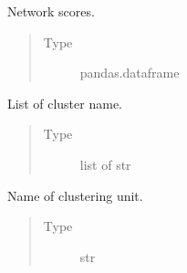 \documentclass[letterpaper,10pt,english]{sphinxmanual}
\begin{document}
\begin{fulllineitems}
\begin{fulllineitems}
\begin{quote}
\begin{description}
\end{description}\end{quote}

\end{fulllineitems}


\begin{fulllineitems}
\label{\detokenize{modules/celloracle:celloracle.Links.merged_score}}
Network scores.
\begin{quote}\begin{description}
\item[{Type}] \leavevmode
pandas.dataframe

\end{description}\end{quote}

\end{fulllineitems}


\begin{fulllineitems}
\label{\detokenize{modules/celloracle:celloracle.Links.cluster}}
List of cluster name.
\begin{quote}\begin{description}
\item[{Type}] \leavevmode
list of str

\end{description}\end{quote}

\end{fulllineitems}


\begin{fulllineitems}
\label{\detokenize{modules/celloracle:celloracle.Links.name}}
Name of clustering unit.
\begin{quote}\begin{description}
\item[{Type}] \leavevmode
str

\end{description}\end{quote}


\end{fulllineitems}
\end{fulllineitems}
\end{document}
